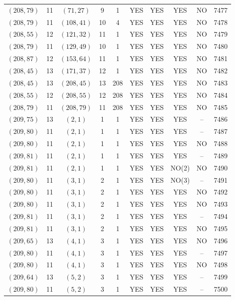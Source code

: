 \begin{longtable}{|c|c|c|c|c|c|c|c|c|c|}
$(208, 79)$ & 11 & $(71, 27)$ & 9 & 1 & YES & YES & YES & NO & 7477\\
$(208, 79)$ & 11 & $(108, 41)$ & 10 & 4 & YES & YES & YES & NO & 7478\\
$(208, 55)$ & 12 & $(121, 32)$ & 11 & 1 & YES & YES & YES & NO & 7479\\
$(208, 79)$ & 11 & $(129, 49)$ & 10 & 1 & YES & YES & YES & NO & 7480\\
$(208, 87)$ & 12 & $(153, 64)$ & 11 & 1 & YES & YES & YES & NO & 7481\\
$(208, 45)$ & 13 & $(171, 37)$ & 12 & 1 & YES & YES & YES & NO & 7482\\
$(208, 45)$ & 13 & $(208, 45)$ & 13 & 208 & YES & YES & YES & NO & 7483\\
$(208, 55)$ & 12 & $(208, 55)$ & 12 & 208 & YES & YES & YES & NO & 7484\\
$(208, 79)$ & 11 & $(208, 79)$ & 11 & 208 & YES & YES & YES & NO & 7485\\
$(209, 75)$ & 13 & $(2, 1)$ & 1 & 1 & YES & YES & YES & -- & 7486\\
$(209, 80)$ & 11 & $(2, 1)$ & 1 & 1 & YES & YES & YES & -- & 7487\\
$(209, 80)$ & 11 & $(2, 1)$ & 1 & 1 & YES & YES & YES & NO & 7488\\
$(209, 81)$ & 11 & $(2, 1)$ & 1 & 1 & YES & YES & YES & -- & 7489\\
$(209, 81)$ & 11 & $(2, 1)$ & 1 & 1 & YES & YES & NO(2) & NO & 7490\\
$(209, 80)$ & 11 & $(3, 1)$ & 2 & 1 & YES & YES & NO(3) & -- & 7491\\
$(209, 80)$ & 11 & $(3, 1)$ & 2 & 1 & YES & YES & YES & NO & 7492\\
$(209, 80)$ & 11 & $(3, 1)$ & 2 & 1 & YES & YES & YES & NO & 7493\\
$(209, 81)$ & 11 & $(3, 1)$ & 2 & 1 & YES & YES & YES & -- & 7494\\
$(209, 81)$ & 11 & $(3, 1)$ & 2 & 1 & YES & YES & YES & NO & 7495\\
$(209, 65)$ & 13 & $(4, 1)$ & 3 & 1 & YES & YES & YES & NO & 7496\\
$(209, 80)$ & 11 & $(4, 1)$ & 3 & 1 & YES & YES & YES & -- & 7497\\
$(209, 80)$ & 11 & $(4, 1)$ & 3 & 1 & YES & YES & YES & NO & 7498\\
$(209, 64)$ & 13 & $(5, 2)$ & 3 & 1 & YES & YES & YES & -- & 7499\\
$(209, 80)$ & 11 & $(5, 2)$ & 3 & 1 & YES & YES & YES & -- & 7500\\

\end{longtable}
